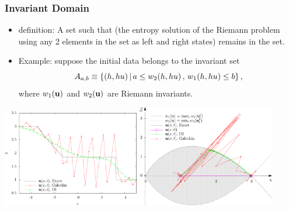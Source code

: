 \begin{frame}
\frametitle{Invariant Domain}

\begin{itemize}
  \item {} definition: A set such that (the entropy solution
    of the Riemann problem
    using any 2 elements in the set as left and right states) remains in the set.
  \item Example: suppose the initial data belongs to the invariant set 
    \[
      A_{a,b} \equiv \{(h,h u) \,|\,
        a \leq w_2(h, h u) \,, \, w_1(h, h u) \leq b\} \,,
    \]
    where $w_1(\mathbf{u})$ and $w_2(\mathbf{u})$ are Riemann invariants.
\end{itemize}

\begin{center}
  \includegraphics[width=0.45\textwidth]{./figures/dam_break_height.pdf}
  \hspace{1ex}
  \includegraphics[width=0.45\textwidth]{./figures/dam_break_phase_with_galerkin.pdf}
\end{center}

\end{frame}
